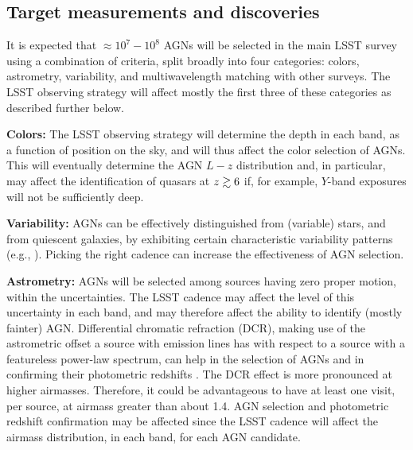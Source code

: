 
\subsection{Target measurements and discoveries}
\label{sec:\secname:targets}




It is expected that $\approx 10^7 - 10^8$ AGNs will be selected in the
main LSST survey using a combination of criteria, split broadly into
four categories: colors, astrometry, variability, and multiwavelength
matching with other surveys. The LSST observing strategy will affect
mostly the first three of these categories as described further below.

{\bf Colors:} The LSST observing strategy will determine the depth in
each band, as a function of position on the sky, and will thus affect
the color selection of AGNs. This will eventually determine the AGN
$L-z$ distribution and, in particular, may affect the identification
of quasars at $z\gtrsim 6$ if, for example, $Y$-band exposures will
not be sufficiently deep.

{\bf Variability:} AGNs can be effectively distinguished from (variable)
stars, and from quiescent galaxies, by exhibiting certain characteristic
variability patterns (e.g., \citet{ButlerandBloom2011}). Picking the
right cadence can increase the effectiveness of AGN selection.


{\bf Astrometry:} AGNs will be selected among sources having zero
proper motion, within the uncertainties. The LSST cadence may affect
the level of this uncertainty in each band, and may therefore affect
the ability to identify (mostly fainter) AGN.
%
Differential chromatic refraction (DCR), making use of the astrometric
offset a source with emission lines has with respect to a source with
a featureless power-law spectrum, can help in the selection of AGNs
and in confirming their photometric redshifts
\citep{KaczmarczikEtal2009}. The DCR effect is more pronounced at
higher airmasses. Therefore, it could be advantageous to have at least one
visit, per source, at airmass greater than about 1.4. AGN selection
and photometric redshift confirmation may be affected since the LSST
cadence will affect the airmass distribution, in each band, for each
AGN candidate.

